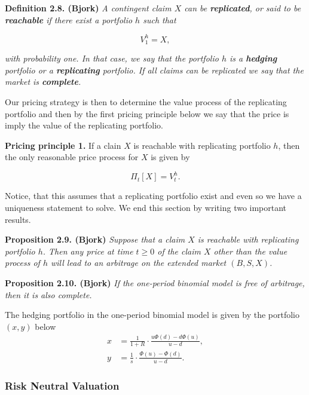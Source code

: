 \documentclass[
]{book}
\begin{document}
\textbf{Definition 2.8. (Bjork)} \emph{A contingent claim \(X\) can be \textbf{replicated}, or said to be \textbf{reachable} if there exist a portfolio \(h\) such that}

\[
V_1^h=X,
\]

\emph{with probability one. In that case, we say that the portfolio \(h\) is a \textbf{hedging} portfolio or a \textbf{replicating} portfolio. If all claims can be replicated we say that the market is \textbf{complete}.}

Our pricing strategy is then to determine the value process of the replicating portfolio and then by the first pricing principle below we say that the price is imply the value of the replicating portfolio.

\textbf{Pricing principle 1.} If a clain \(X\) is reachable with replicating portfolio \(h\), then the only reasonable price process for \(X\) is given by

\[
\Pi_t[X]=V_t^h.
\]

Notice, that this assumes that a replicating portfolio exist and even so we have a uniqueness statement to solve. We end this section by writing two important results.

\textbf{Proposition 2.9. (Bjork)} \emph{Suppose that a claim \(X\) is reachable with replicating portfolio \(h\). Then any price at time \(t\ge 0\) of the claim \(X\) other than the value process of \(h\) will lead to an arbitrage on the extended market \((B,S,X)\).}

\textbf{Proposition 2.10. (Bjork)} \emph{If the one-period binomial model is free of arbitrage, then it is also complete.}

The hedging portfolio in the one-period binomial model is given by the portfolio \((x,y)\) below
\begin{align*}
x&=\frac{1}{1+R}\cdot\frac{u\Phi(d)-d\Phi(u)}{u-d},\tag{2.2}\\
y&=\frac{1}{s}\cdot\frac{\Phi(u)-\Phi(d)}{u-d}.\tag{2.3}
\end{align*}

\hypertarget{risk-neutral-valuation}{%
\subsubsection{Risk Neutral Valuation}\label{risk-neutral-valuation}}
\end{document}
